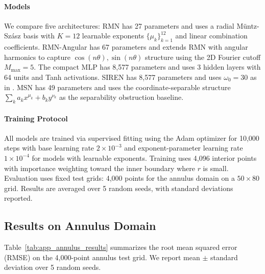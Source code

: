 \documentclass[twoside,11pt]{article}
\begin{document}
\paragraph{Models}
We compare five architectures: RMN has 27 parameters and uses a radial M\"untz-Sz\'asz basis with $K=12$ learnable exponents $\{\mu_k\}_{k=1}^{12}$ and linear combination coefficients. RMN-Angular has 67 parameters and extends RMN with angular harmonics to capture $\cos(n\theta), \sin(n\theta)$ structure using the 2D Fourier cutoff $M_{\max}=5$. The compact MLP has 8,577 parameters and uses 3 hidden layers with 64 units and Tanh activations. SIREN has 8,577 parameters and uses $\omega_0=30$ as in \citet{sitzmann2020siren}. MSN has 49 parameters and uses the coordinate-separable structure $\sum_k a_k x^{\mu_k} + b_k y^{\nu_k}$ as the separability obstruction baseline.

\paragraph{Training Protocol}
All models are trained via supervised fitting using the Adam optimizer for 10,000 steps with base learning rate $2\times 10^{-3}$ and exponent-parameter learning rate $1\times 10^{-4}$ for models with learnable exponents. Training uses 4,096 interior points with importance weighting toward the inner boundary where $r$ is small. Evaluation uses fixed test grids: 4,000 points for the annulus domain on a $50\times 80$ grid. Results are averaged over 5 random seeds, with standard deviations reported.

\subsection{Results on Annulus Domain}

Table~\ref{tab:app_annulus_results} summarizes the root mean squared error (RMSE) on the 4,000-point annulus test grid. We report mean $\pm$ standard deviation over 5 random seeds.
\end{document}
